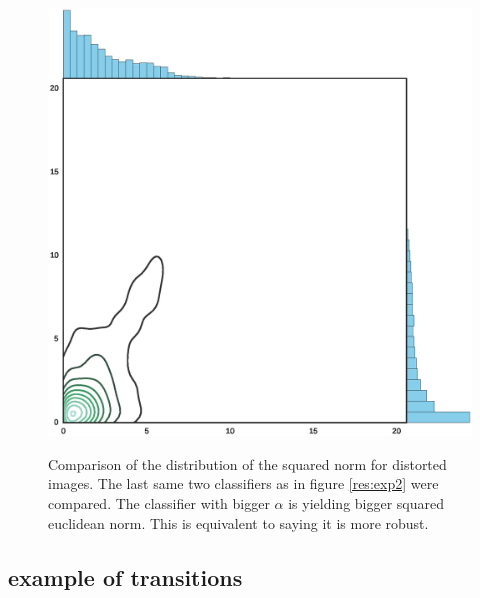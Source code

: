 \documentclass{article} %
\begin{document}
\begin{figure}[h!]
\begin{center}
\includegraphics[scale=0.6]{figs/sup_2}
\label{exp:sup_2_bigger}
\caption{\small Comparison of the distribution of the squared norm for distorted images. The last same two classifiers as in figure \ref{res:exp2} were compared.
The classifier with bigger $\alpha$ is yielding bigger squared euclidean norm.
This is equivalent to saying it is more robust.}
\end{center}
\end{figure}

\null
\vfill
\raggedbottom
\pagebreak
\newpage

\subsection{example of transitions}
\end{document}
